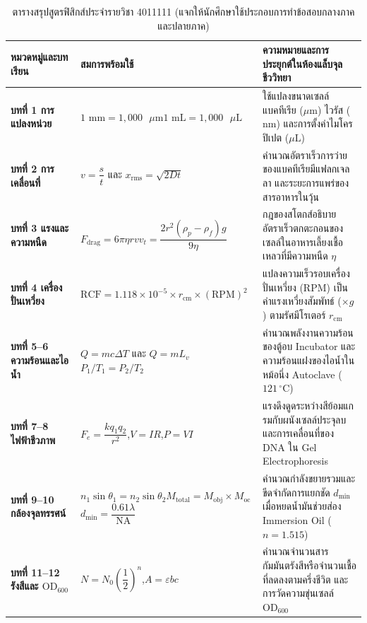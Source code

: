 \begin{table}[H]
\centering
\caption{ตารางสรุปสูตรฟิสิกส์ประจำรายวิชา 4011111 (แจกให้นักศึกษาใช้ประกอบการทำข้อสอบกลางภาคและปลายภาค)}
\small
\begin{tabularx}{\textwidth}{>{\raggedright\arraybackslash\bfseries}p{3.3cm} p{4.5cm} >{\raggedright\arraybackslash}X}
\toprule
หมวดหมู่และบทเรียน & สมการพร้อมใช้ & ความหมายและการประยุกต์ในห้องแล็บจุลชีววิทยา \\
\midrule
บทที่ 1 การแปลงหน่วย & $1\text{ mm} = 1{,}000\text{ }\mu\text{m}$\newline $1\text{ mL} = 1{,}000\text{ }\mu\text{L}$ & ใช้แปลงขนาดเซลล์แบคทีเรีย ($\mu\text{m}$) ไวรัส ($\text{nm}$) และการตั้งค่าไมโครปิเปต ($\mu\text{L}$) \\
\addlinespace[4pt]
บทที่ 2 การเคลื่อนที่ & $v = \dfrac{s}{t}$ และ $x_{\text{rms}} = \sqrt{2Dt}$ & คำนวณอัตราเร็วการว่ายของแบคทีเรียมีแฟลกเจลลา และระยะการแพร่ของสารอาหารในวุ้น \\
\addlinespace[4pt]
บทที่ 3 แรงและความหนืด & $F_{\text{drag}} = 6\pi \eta r v$\newline $v_t = \dfrac{2 r^2 (\rho_p - \rho_f) g}{9\eta}$ & กฎของสโตกส์อธิบายอัตราเร็วตกตะกอนของเซลล์ในอาหารเลี้ยงเชื้อเหลวที่มีความหนืด $\eta$ \\
\addlinespace[4pt]
บทที่ 4 เครื่องปั่นเหวี่ยง & $\text{RCF} = 1.118 \times 10^{-5} \times r_{\text{cm}} \times (\text{RPM})^2$ & แปลงความเร็วรอบเครื่องปั่นเหวี่ยง (RPM) เป็นค่าแรงเหวี่ยงสัมพัทธ์ ($\times g$) ตามรัศมีโรเตอร์ $r_{\text{cm}}$ \\
\addlinespace[4pt]
บทที่ 5--6 ความร้อนและไอน้ำ & $Q = mc\Delta T$ และ $Q = mL_v$\newline $P_1 / T_1 = P_2 / T_2$ & คำนวณพลังงานความร้อนของตู้อบ Incubator และความร้อนแฝงของไอน้ำในหม้อนึ่ง Autoclave ($121\,^\circ\text{C}$) \\
\addlinespace[4pt]
บทที่ 7--8 ไฟฟ้าชีวภาพ & $F_e = \dfrac{k q_1 q_2}{r^2}$,\quad $V = IR$,\quad $P = VI$ & แรงดึงดูดระหว่างสีย้อมแกรมกับผนังเซลล์ประจุลบ และการเคลื่อนที่ของ DNA ใน Gel Electrophoresis \\
\addlinespace[4pt]
บทที่ 9--10 กล้องจุลทรรศน์ & $n_1 \sin\theta_1 = n_2 \sin\theta_2$\newline $M_{\text{total}} = M_{\text{obj}} \times M_{\text{oc}}$\newline $d_{\min} = \dfrac{0.61\lambda}{\text{NA}}$ & คำนวณกำลังขยายรวมและขีดจำกัดการแยกชัด $d_{\min}$ เมื่อหยดน้ำมันช่วยส่อง Immersion Oil ($n=1.515$) \\
\addlinespace[4pt]
บทที่ 11--12 รังสีและ $\text{OD}_{600}$ & $N = N_0 \left(\dfrac{1}{2}\right)^n$,\quad $A = \varepsilon b c$ & คำนวณจำนวนสารกัมมันตรังสีหรือจำนวนเชื้อที่ลดลงตามครึ่งชีวิต และการวัดความขุ่นเซลล์ $\text{OD}_{600}$ \\
\bottomrule
\end{tabularx}
\end{table}

